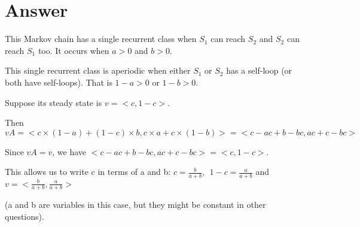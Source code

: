 \documentclass[11pt]{article}
\begin{document}
\section{Answer}
This Markov chain has a single recurrent class when $S_1$ can reach $S_2$ and $S_2$ can reach $S_1$ too. 
It occurs when $a > 0$ and $b > 0$. 

This single recurrent class is aperiodic when either $S_1$ or $S_2$ has a self-loop (or both have self-loops). 
That is $1 - a > 0$ or $1 - b > 0$.

Suppose its steady state is $v = <c, 1-c>$.

Then $vA = <c \times (1-a) + (1-c) \times b, c \times a + c \times (1-b)> = <c - ac + b - bc, ac + c - bc> $

Since $vA = v$, we have $<c - ac + b - bc, ac + c - bc> = <c, 1-c>$.

This allows us to write c in terms of a and b:
$c = \frac{b}{a+b}, \:\: 1-c = \frac{a}{a+b}$ and $v = <\frac{b}{a+b}, \frac{a}{a+b}>$

(a and b are variables in this case, but they might be constant in other questions).
\end{document}
